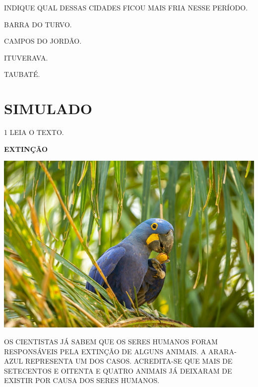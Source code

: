 INDIQUE QUAL DESSAS CIDADES FICOU MAIS FRIA NESSE PERÍODO.

\begin{escolha}
\item BARRA DO TURVO.

\item CAMPOS DO JORDÃO.

\item ITUVERAVA.

\item TAUBATÉ.
\end{escolha}

\pagebreak




\chapter[SIMULADO 2]{SIMULADO}

\num{1} LEIA O TEXTO.

\begin{myquote}
\textbf{EXTINÇÃO}

\medskip

\begin{center}
\includegraphics[width=.9\textwidth]{media/image118.png}
\end{center}

\medskip

OS CIENTISTAS JÁ SABEM QUE OS SERES HUMANOS FORAM RESPONSÁVEIS PELA EXTINÇÃO DE ALGUNS ANIMAIS. A ARARA-AZUL REPRESENTA UM DOS CASOS. ACREDITA-SE QUE MAIS DE SETECENTOS E OITENTA E QUATRO ANIMAIS JÁ
DEIXARAM DE EXISTIR POR CAUSA DOS SERES HUMANOS.
\end{myquote}

